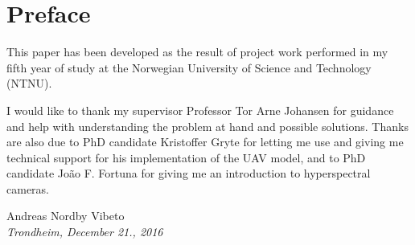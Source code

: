 \section*{Preface}

\vspace{2cm}

This paper has been developed as the result of project work performed in my fifth year of study at the Norwegian University of Science and Technology (NTNU).

I would like to thank my supervisor Professor Tor Arne Johansen for guidance and help with understanding the problem at hand and possible solutions. Thanks are also due to PhD candidate Kristoffer Gryte for letting me use and giving me technical support for his implementation of the UAV model, and to PhD candidate João F. Fortuna for giving me an introduction to hyperspectral cameras.

\vspace{2cm}

\begin{center}
	Andreas Nordby Vibeto \\
	\emph{Trondheim, December 21., 2016}
\end{center}